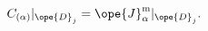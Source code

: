 \begin{equation}	\label{5.8}
C_{(\alpha)}|_{\ope{D}_j}  = \ope{J}_\alpha^{\mathrm{m}}|_{\ope{D}_j} .
	\end{equation}

